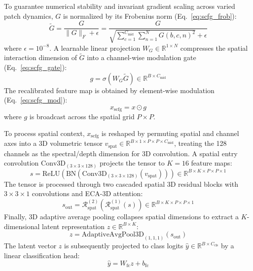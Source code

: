 \documentclass[manuscript,screen,review]{acmart}
\begin{document}
To guarantee numerical stability and invariant gradient scaling across varied patch dynamics, $G$ is normalized by its Frobenius norm (Eq.~\ref{eq:scfg_frob}):
\begin{equation}
\label{eq:scfg_frob}
\tilde{G} = \frac{G}{\|G\|_F + \epsilon} = \frac{G}{\sqrt{\sum_{c=1}^{C_{\text{mid}}} \sum_{n=1}^N G(b, c, n)^2} + \epsilon}
\end{equation}
where $\epsilon = 10^{-8}$. A learnable linear projection $W_G \in \mathbb{R}^{1 \times N}$ compresses the spatial interaction dimension of $\tilde{G}$ into a channel-wise modulation gate (Eq.~\ref{eq:scfg_gate}):
\begin{equation}
\label{eq:scfg_gate}
g = \sigma\left(W_G \tilde{G}\right) \in \mathbb{R}^{B \times C_{\text{mid}}}
\end{equation}
The recalibrated feature map is obtained by element-wise modulation (Eq.~\ref{eq:scfg_mod}):
\begin{equation}
\label{eq:scfg_mod}
x_{\text{scfg}} = x \odot g
\end{equation}
where $g$ is broadcast across the spatial grid $P \times P$.

To process spatial context, $x_{\text{scfg}}$ is reshaped by permuting spatial and channel axes into a 3D volumetric tensor $v_{\text{spat}} \in \mathbb{R}^{B \times 1 \times P \times P \times C_{\text{mid}}}$, treating the 128 channels as the spectral/depth dimension for 3D convolution. A spatial entry convolution $\text{Conv3D}_{(3 \times 3 \times 128)}$ projects the tensor to $K=16$ feature maps:
\begin{equation}
\label{eq:spat_entry}
s = \text{ReLU}\left(\text{BN}\left(\text{Conv3D}_{(3 \times 3 \times 128)}(v_{\text{spat}})\right)\right) \in \mathbb{R}^{B \times K \times P \times P \times 1}
\end{equation}
The tensor is processed through two cascaded spatial 3D residual blocks with $3 \times 3 \times 1$ convolutions and ECA-3D attention:
\begin{equation}
\label{eq:spat_res}
s_{\text{out}} = \mathcal{R}_{\text{spat}}^{(2)}\left(\mathcal{R}_{\text{spat}}^{(1)}(s)\right) \in \mathbb{R}^{B \times K \times P \times P \times 1}
\end{equation}
Finally, 3D adaptive average pooling collapses spatial dimensions to extract a $K$-dimensional latent representation $z \in \mathbb{R}^{B \times K}$:
\begin{equation}
\label{eq:global_pool}
z = \text{AdaptiveAvgPool3D}_{(1,1,1)}(s_{\text{out}})
\end{equation}
The latent vector $z$ is subsequently projected to class logits $\hat{y} \in \mathbb{R}^{B \times C_{\text{cls}}}$ by a linear classification head:
\begin{equation}
\label{eq:fc_out}
\hat{y} = W_{\text{fc}} z + b_{\text{fc}}
\end{equation}
\end{document}
